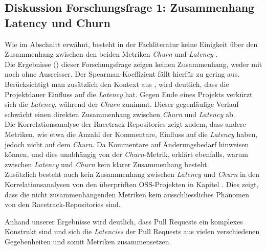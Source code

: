 \subsection{Diskussion Forschungsfrage 1: Zusammenhang Latency und Churn}
Wie im Abschnitt  erwähnt, besteht in der Fachliteratur keine Einigkeit über den Zusammenhang zwischen den beiden Metriken \textit{Churn} und \textit{Latency} \parencite{yu_wait_2015}\parencite{hasan_understanding_2023}\parencite{kudrjavets_small_2022}. \\
Die Ergebnisse () dieser Forschungsfrage zeigen keinen Zusammenhang, weder mit noch ohne Ausreisser. Der Spearman-Koeffizient fällt hierfür zu gering aus. \\
Berücksichtigt man zusätzlich den Kontext aus , wird deutlich, dass die Projektdauer Einfluss auf die \textit{Latency} hat. Gegen Ende eines Projekts verkürzt sich die \textit{Latency}, während der \textit{Churn} zunimmt. Dieser gegenläufige Verlauf schwächt einen direkten Zusammenhang zwischen \textit{Churn} und \textit{Latency} ab. \\
Die Korrelationsanalyse der Racetrack-Repositories zeigt zudem, dass andere Metriken, wie etwa die Anzahl der Kommentare, Einfluss auf die \textit{Latency} haben, jedoch nicht auf dem \textit{Churn}. Da Kommentare auf Änderungsbedarf hinweisen können, und dies unabhängig von der \textit{Churn}-Metrik, erklärt  ebenfalls, warum zwischen \textit{Latency} und \textit{Churn} kein klarer Zusammenhang besteht. \\
Zusätzlich besteht auch kein Zusammenhang zwischen \textit{Latency} und \textit{Churn} in den Korrelationsanalysen von den überprüften OSS-Projekten in Kapitel . Dies zeigt, dass die nicht zusammenhängenden Metriken kein ausschliessliches Phänomen von den Racetrack-Repositories sind.

Anhand unserer Ergebnisse wird deutlich, dass Pull Requests ein komplexes Konstrukt sind und sich die \textit{Latencies} der Pull Requests aus vielen verschiedenen Gegebenheiten und somit Metriken zusammensetzen.

